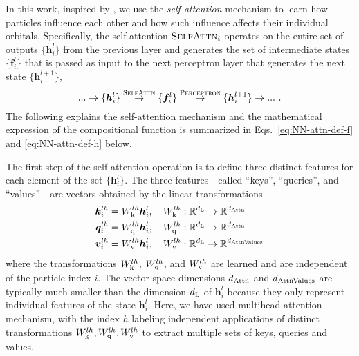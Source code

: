 \documentclass[
 reprint,
 amsmath,amssymb,
 aps, prx,
floatfix,longbibliography,
]{revtex4-2}
\begin{document}
In this work, inspired by \cite{vonGlehn2022Nov}, we use the {\it self-attention} mechanism \cite{transformer} to learn how particles influence each other and how such influence affects their individual orbitals.
Specifically, the self-attention ${\rm \textsc{SelfAttn}}_i$ operates on the entire set of outputs $\{ \bm h_i^l \}$ from the previous layer and generates the set of intermediate states $\{ \bm f_i^l \}$ that is passed as input to the next perceptron layer that generates the next state $\{ \bm h_i^{l + 1} \}$,
$$ ... \to \{ \bm h_i^l \} \overset{{\rm \textsc{SelfAttn}}}{\rightarrow} \{ \bm f_i^l \} \overset{{\rm \textsc{Perceptron}}}{\rightarrow} \{ \bm h_i^{l+1} \} \to ...\ .$$
The following explains the self-attention mechanism and the mathematical expression of the compositional function is summarized in Eqs.~\eqref{eq:NN-attn-def-f} and \eqref{eq:NN-attn-def-h} below.

The first step of the self-attention operation is to define three distinct features for each element of the set $\{ \bm h_i^l \}$.  %
The three features---called ``keys'', ``queries'', and ``values''---are vectors obtained by the linear transformations 
\begin{align}
    \bm k_i^{lh} & = W_{\rm k}^{lh} \bm h_i^l,\quad  W_{\rm k}^{lh} : \mathbb{R}^{d_{\rm L}} \to \mathbb{R}^{d_{\rm Attn}}\\ 
    \bm q_i^{lh} & = W_{\rm q}^{lh} \bm h_i^l,\quad  W_{\rm q}^{lh} : \mathbb{R}^{d_{\rm L}} \to \mathbb{R}^{d_{\rm Attn}} \\ 
    \bm v_i^{lh} & = W_{\rm v}^{lh} \bm h_i^l,\quad  W_{\rm v}^{lh} : \mathbb{R}^{d_{\rm L}} \to \mathbb{R}^{d_{\rm AttnValues}}
\end{align}
where the transformations $W_{\rm k}^{lh}$, $W_{\rm q}^{lh}$, and $W_{\rm v}^{lh}$ are learned and are independent of the particle index $i$.
The vector space dimensions $d_{\rm Attn}$ and $d_{\rm AttnValues}$ are typically much smaller than the dimension $d_{\rm L}$ of $\bm h_i^l$ because they only represent individual features of the state $\bm h_i^l$. %
Here, we have used multihead attention mechanism, with the index $h$ labeling independent applications of %
distinct transformations $W_{\rm k}^{lh}, W_{\rm q}^{lh}, W_{\rm v}^{lh}$ to extract multiple sets of keys, queries and values.   
\end{document}
